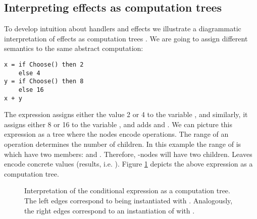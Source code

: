 \subsection{Interpreting effects as computation trees}\label{sec:effects-as-computation-trees}
To develop intuition about handlers and effects we illustrate a diagrammatic interpretation of effects as computation trees \cite{Lindley2014}. We are going to assign different semantics to the same abstract computation:
\begin{lstlisting}[style=haskell]
x = if Choose() then 2
    else 4
y = if Choose() then 8
    else 16
x + y 
\end{lstlisting}
The expression assigns either the value 2 or 4 to the variable , and similarly, it assigns either 8 or 16 to the variable , and adds  and .
We can picture this expression as a tree where the nodes encode operations. The range of an operation determines the number of children. In this example the range of  is  which have two members:  and . Therefore, -nodes will have two children. Leaves encode concrete values (results, i.e. ). Figure \ref{fig:condexp} depicts the above expression as a computation tree.
\begin{figure}[t]
\begin{center}
\end{center}\caption{Interpretation of the conditional expression as a computation tree. The left edges correspond to  being instantiated with . Analogously, the right edges correspond to an instantiation of  with .}\label{fig:condexp}
\end{figure}

